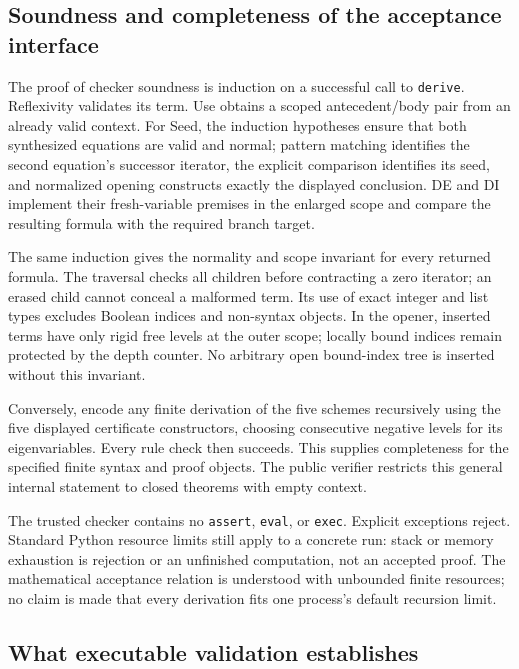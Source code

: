 \documentclass[11pt,letterpaper]{article}
\newcommand{\file}[1]{\nolinkurl{#1}}
\begin{document}
\subsection{Soundness and completeness of the acceptance interface}

The proof of checker soundness is induction on a successful call to
\file{derive}. Reflexivity validates its term. Use obtains a scoped
antecedent/body pair from an already valid context. For Seed, the induction
hypotheses ensure that both synthesized equations are valid and normal;
pattern matching identifies the second equation's successor iterator,
the explicit comparison identifies its seed, and normalized opening
constructs exactly the displayed conclusion. DE and DI implement their
fresh-variable premises in the enlarged scope and compare the resulting
formula with the required branch target.

The same induction gives the normality and scope invariant for every
returned formula. The traversal checks all children before contracting a
zero iterator; an erased child cannot conceal a malformed term. Its use
of exact integer and list types excludes Boolean indices and non-syntax
objects. In the opener, inserted terms have only rigid free levels at the
outer scope; locally bound indices remain protected by the depth counter.
No arbitrary open bound-index tree is inserted without this invariant.

Conversely, encode any finite derivation of the five schemes recursively
using the five displayed certificate constructors, choosing consecutive
negative levels for its eigenvariables. Every rule check then succeeds.
This supplies completeness for the specified finite syntax and proof
objects. The public verifier restricts this general internal statement to
closed theorems with empty context.

The trusted checker contains no \file{assert}, \file{eval}, or
\file{exec}. Explicit exceptions reject. Standard Python resource limits
still apply to a concrete run: stack or memory exhaustion is rejection or
an unfinished computation, not an accepted proof. The mathematical
acceptance relation is understood with unbounded finite resources; no
claim is made that every derivation fits one process's default recursion
limit.

\subsection{What executable validation establishes}
\end{document}
